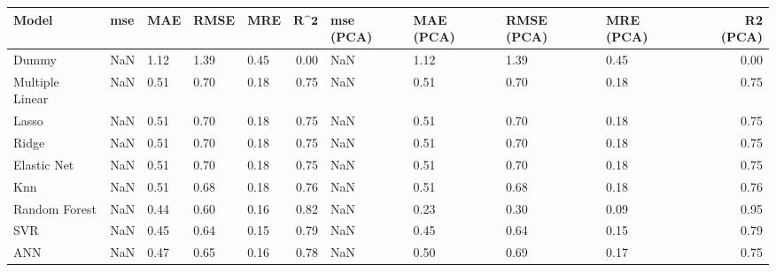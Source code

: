 \begin{table}
\centering
\label{table:iri_reg_pred}
\begin{tabular}{lllllrllllr}
\toprule
 \textbf{Model} & \textbf{mse} & \textbf{MAE} & \textbf{RMSE} & \textbf{MRE} & $\textbf{R^2}$ & \textbf{mse (PCA)} & \textbf{MAE (PCA)} & \textbf{RMSE (PCA)} & \textbf{MRE (PCA)} & \textbf{R2 (PCA)} \\
\midrule
          Dummy &          NaN &         1.12 &          1.39 &         0.45 &           0.00 &                NaN &               1.12 &                1.39 &               0.45 &              0.00 \\
Multiple Linear &          NaN &         0.51 &          0.70 &         0.18 &           0.75 &                NaN &               0.51 &                0.70 &               0.18 &              0.75 \\
          Lasso &          NaN &         0.51 &          0.70 &         0.18 &           0.75 &                NaN &               0.51 &                0.70 &               0.18 &              0.75 \\
          Ridge &          NaN &         0.51 &          0.70 &         0.18 &           0.75 &                NaN &               0.51 &                0.70 &               0.18 &              0.75 \\
    Elastic Net &          NaN &         0.51 &          0.70 &         0.18 &           0.75 &                NaN &               0.51 &                0.70 &               0.18 &              0.75 \\
            Knn &          NaN &         0.51 &          0.68 &         0.18 &           0.76 &                NaN &               0.51 &                0.68 &               0.18 &              0.76 \\
  Random Forest &          NaN &         0.44 &          0.60 &         0.16 &           0.82 &                NaN &               0.23 &                0.30 &               0.09 &              0.95 \\
            SVR &          NaN &         0.45 &          0.64 &         0.15 &           0.79 &                NaN &               0.45 &                0.64 &               0.15 &              0.79 \\
            ANN &          NaN &         0.47 &          0.65 &         0.16 &           0.78 &                NaN &               0.50 &                0.69 &               0.17 &              0.75 \\
\bottomrule
\end{tabular}
\end{table}
